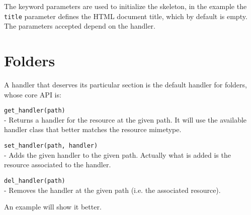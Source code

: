 The keyword parameters are used to initialize the skeleton, in the example
the {\tt title} parameter defines the HTML document title, which by default
is empty. The parameters accepted depend on the handler.



\section{Folders}

A handler that deserves its particular section is the default handler for
folders, whose core API is:

\begin{api}
  {\tt get\_handler(path)}\\
  - Returns a handler for the resource at the given path. It will use the
    available handler class that better matches the resource mimetype.

  {\tt set\_handler(path, handler)}\\
  - Adds the given handler to the given path. Actually what is added is
    the resource associated to the handler.

  {\tt del\_handler(path)}\\
  - Removes the handler at the given path (i.e. the associated resource).
\end{api}

An example will show it better.


